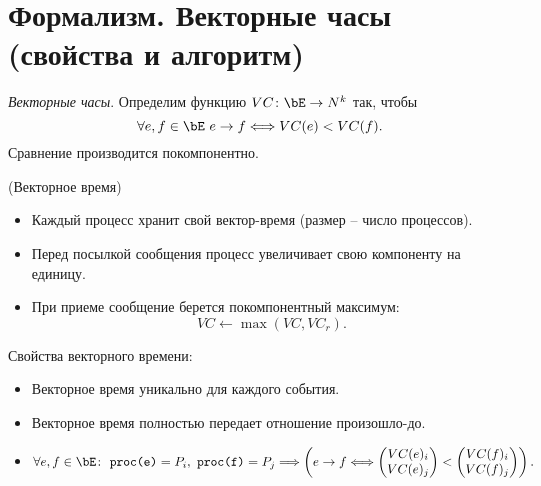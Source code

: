 \section{Формализм. Векторные часы (свойства и алгоритм)}

\begin{definition}
    \textit{Векторные часы}. Определим функцию $VC \colon \bE \to N^k$
    так, чтобы
    \[
        \forall e, f \in \bE~ e \to f \Llra VC(e) < VC(f)
    .\]
    Сравнение производится покомпонентно.
\end{definition}

\begin{algorithm}(Векторное время)
    \begin{itemize}
        \item Каждый процесс хранит свой вектор-время (размер -- число процессов).
        \item Перед посылкой сообщения процесс увеличивает свою компоненту на единицу.
        \item При приеме сообщение берется покомпонентный максимум:
            \[
                VC \leftarrow \max(VC, VC_r)
            .\]
    \end{itemize}
\end{algorithm} 

Свойства векторного времени:
\begin{itemize}
    \item Векторное время уникально для каждого события.
    \item Векторное время полностью передает отношение произошло-до.
    \item 
        \[
            \forall e, f \in \bE\colon~ \texttt{proc(e)} = P_i,~
            \texttt{proc(f)} = P_j \Lra
            \left(e \to f \Llra \begin{pmatrix}
                VC(e)_i \\
                VC(e)_j
            \end{pmatrix} < \begin{pmatrix}
                VC(f)_i \\ 
                VC(f)_j
            \end{pmatrix}\right)
        .\]
\end{itemize}
